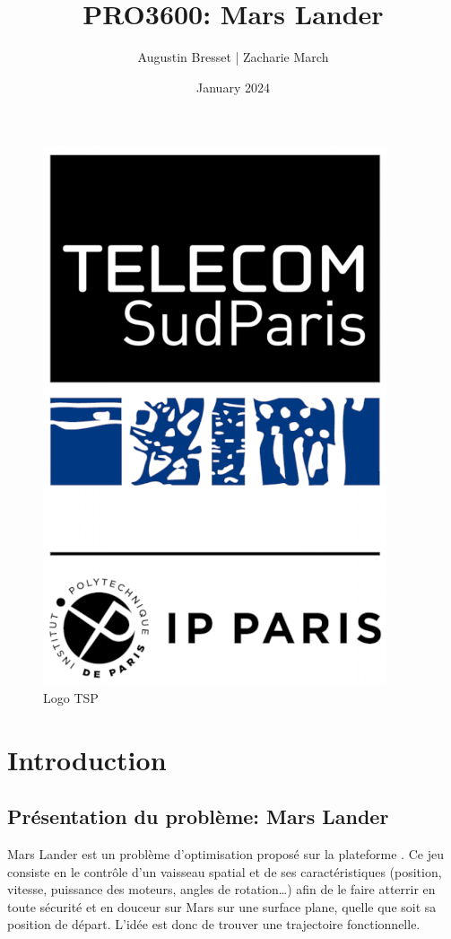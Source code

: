 \documentclass[french,a4paper,10pt,twocolumn]{article}
\title{PRO3600: Mars Lander}
\author{Augustin Bresset | Zacharie March}
\date{January 2024}
\begin{document}
\onecolumn
\maketitle

\begin{figure}[h]
    \centering
    \includegraphics[scale=0.2]{images/logo-tsp-fond-blanc.png}
    \caption{Logo TSP}\label{fig:logo}
\end{figure}

\tableofcontents
\twocolumn
\pagebreak

\section{Introduction}

\subsection{Présentation du problème: Mars Lander}

Mars Lander est un problème d'optimisation proposé sur la plateforme \cite[]{codingame_mars_lander}.
Ce jeu consiste en le contrôle d'un vaisseau spatial et de ses caractéristiques (position, vitesse, puissance des moteurs, angles de rotation…) 
afin de le faire atterrir en toute sécurité et en douceur sur Mars sur une surface plane, quelle que soit sa position de départ. 
L'idée est donc de trouver une trajectoire fonctionnelle.
\end{document}
